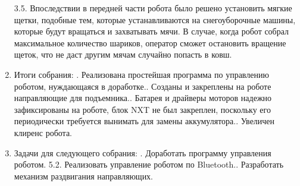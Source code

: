 \documentclass[11pt]{article}
\begin{document}
\begin{enumerate}
            3.5.   Впоследствии в передней части робота было решено установить мягкие щетки, подобные тем, которые устанавливаются на снегоуборочные машины, которые будут вращаться и захватывать мячи. В случае, когда робот собрал максимальное количество шариков, оператор сможет остановить вращение щеток, что не даст другим мячам случайно попасть в ковш.
            \item Итоги собрания:
            .   Реализована простейшая программа по управлению роботом, нуждающаяся в доработке..   Созданы и закреплены на роботе направляющие для подъемника..   Батарея и драйверы моторов надежно зафиксированы на роботе, блок NXT не был закреплен, поскольку его периодически требуется вынимать для замены аккумулятора..   Увеличен клиренс робота.\newline
            
            \item Задачи для следующего собрания:
            .   Доработать программу управления роботом.
            5.2.   Реализовать управление роботом по Bluetooth..   Разработать механизм раздвигания направляющих.
         \end{enumerate}
         \newpage
\end{document}
